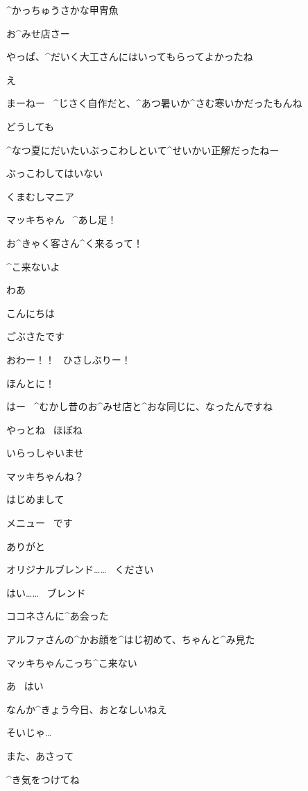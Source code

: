 \page[84]
\Sign ^{かっちゅうさかな}{甲冑魚}

\page[85]
\Makki お^{みせ}{店}さー

\Makki やっぱ、^{だいく}{大工}さんにはいってもらってよかったね

\Alpha え

\Alpha まーねー
\ ^{じさく}{自作}だと、^{あつ}{暑}いか^{さむ}{寒}いかだったもんね

\Alpha どうしても

\Makki ^{なつ}{夏}にだいたいぶっこわしといて^{せいかい}{正解}だったねー

\Alpha ぶっこわしてはいない

\page[86]
\Sign くまむしマニア

\Alpha マッキちゃん
\ ^{あし}{足}！

\Alpha お^{きゃく}{客}さん^{く}{来}るって！

\Makki ^{こ}{来}ないよ

\page[88]
\Alpha わあ

\Kokone こんにちは

\Kokone ごぶさたです

\Alpha おわー！！
\ ひさしぶりー！

\Kokone ほんとに！

\page[89]
\Kokone はー
\ ^{むかし}{昔}のお^{みせ}{店}と^{おな}{同}じに、なったんですね

\Alpha やっとね
\ ほぼね

\page[90]
\Makki いらっしゃいませ

\Kokone マッキちゃんね？

\Kokone はじめまして

\page[91]
\Makki メニュー
\ です

\Kokone ありがと

\page[92]
\Kokone オリジナルブレンド……
\ ください

\Makki はい……
\ ブレンド

\page[95]
\Makki ココネさんに^{あ}{会}った

\Makki アルファさんの^{かお}{顔}を^{はじ}{初}めて、ちゃんと^{み}{見}た

\Kokone マッキちゃんこっち^{こ}{来}ない

\Makki あ
\ はい

\Alpha なんか^{きょう}{今日}、おとなしいねえ

\page[96]
\Makki そいじゃ…

\Alpha また、あさって

\Kokone ^{き}{気}をつけてね

